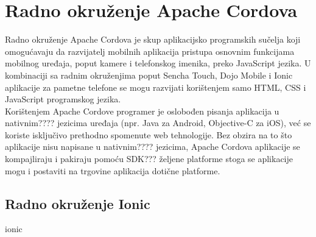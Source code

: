\chapter{Radno okruženje Apache Cordova}
Radno okruženje Apache Cordova je skup aplikacijsko programskih sučelja  koji omogućavaju da razvijatelj mobilnih aplikacija pristupa osnovnim funkcijama mobilnog uređaja, poput kamere i telefonskog imenika, preko JavaScript jezika. 
U kombinaciji sa radnim okruženjima poput Sencha Touch, Dojo Mobile i Ionic aplikacije za pametne telefone se mogu razvijati korištenjem samo HTML, CSS i JavaScript programskog jezika.
\\

Korištenjem Apache Cordove programer je oslobođen pisanja aplikacija u nativnim???? jezicima uređaja (npr. Java za Android, Objective-C za iOS), već se koriste isključivo prethodno spomenute web tehnologije. 
Bez obzira na to što aplikacije nisu napisane u nativnim???? jezicima, Apache Cordova aplikacije se kompajliraju i pakiraju pomoću SDK??? željene platforme stoga se aplikacije mogu i postaviti na trgovine aplikacija  dotične platforme. 
\\



\section*{Radno okruženje Ionic}
ionic